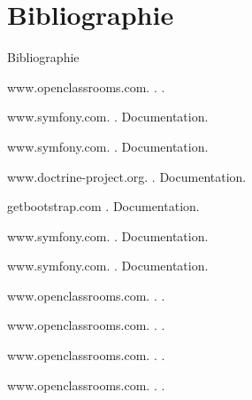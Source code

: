 \documentclass[french]{beamer}
\begin{document}
\section{Bibliographie}
\begin{frame}{Bibliographie}
	


\begin{thebibliography}{10}
    
  \beamertemplatebookbibitems

   www.openclassrooms.com.
    .
    \newblock .
 
   www.symfony.com.
    .
    \newblock Documentation.
    
    www.symfony.com.
    .
    \newblock Documentation.
    
   www.doctrine-project.org.
    .
    \newblock Documentation.

 getbootstrap.com
    .
    \newblock Documentation.
    
   
    
    
    www.symfony.com.
    .
    \newblock Documentation.
    
    www.symfony.com.
    .
    \newblock Documentation.
    
   www.openclassrooms.com.
    .
    \newblock .
    
   www.openclassrooms.com.
    .
    \newblock .
    
   www.openclassrooms.com.
    .
    \newblock .

   www.openclassrooms.com.
    .
    \newblock .

   
  \end{thebibliography}
\end{frame}
\end{document}
